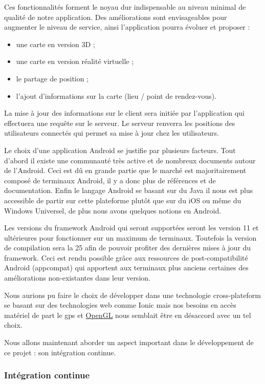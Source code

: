 Ces fonctionnalités forment le noyau dur indispensable au niveau minimal de qualité de notre application. Des améliorations sont envisageables pour augmenter le niveau de service, ainsi l'application pourra évoluer et proposer :
\begin{itemize}
    \item une carte en version 3D ;
    \item une carte en version réalité virtuelle ;
    \item le partage de position ;
    \item l'ajout d'informations sur la carte (lieu / point de rendez-vous).
\end{itemize}

La mise à jour des informations sur le client sera initiée par l’application qui effectuera une requête sur le serveur. Le serveur renverra les positions des utilisateurs connectés qui permet sa mise à jour chez les utilisateurs.

Le choix d'une application Android se justifie par plusieurs facteurs. Tout d’abord il existe une communauté très active et de nombreux documents autour de l’Android. Ceci est dû en grande partie que le marché est majoritairement composé de terminaux Android, il y a donc plus de références et de documentation. Enfin le langage Android se basant sur du Java il nous est plus accessible de partir sur cette plateforme plutôt que sur du iOS ou même du Windows Universel, de plus nous avons quelques notions en Android.

Les versions du framework Android qui seront supportées seront les version 11 et ultérieures pour fonctionner sur un maximum de terminaux. Toutefois la version de compilation sera la 25 afin de pouvoir profiter des dernières mises à jour du framework. Ceci est rendu possible grâce aux ressources de post-compatibilité Android (appcompat) qui apportent aux terminaux plus anciens certaines des améliorations non-existantes dans leur version.

Nous aurions pu faire le choix de développer dans une technologie cross-plateform se basant sur des technologies web comme Ionic mais nos besoins en accès matériel de part le gps et \underline{OpenGL} nous semblait être en désaccord avec un tel choix.

Nous allons maintenant aborder un aspect important dans le développement de ce projet : son intégration continue.

\subsubsection{Intégration continue}

